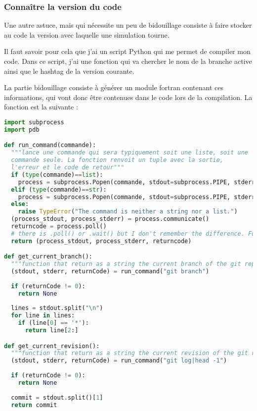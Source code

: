 \subsubsection{Connaître la version du code} 
Une autre astuce, mais qui nécessite un peu de bidouillage consiste à faire stocker au code la version avec laquelle une simulation tourne. 

Il faut savoir pour cela que j'ai un script Python qui me permet de compiler mon code. Dans ce script, j'ai une fonction qui va chercher le nom de la branche active ainsi que le hashtag de la version courante. 

La partie bidouillage consiste à générer un module fortran contenant ces informations, qui vont donc être contenues dans le code lors de la compilation. La fonction est la suivante :
\begin{lstlisting}[language=python]
import subprocess
import pdb

def run_command(commande):
  """lance une commande qui sera typiquement soit une liste, soit une 
  commande seule. La fonction renvoit un tuple avec la sortie, 
  l'erreur et le code de retour"""
  if (type(commande)==list):
    process = subprocess.Popen(commande, stdout=subprocess.PIPE, stderr=subprocess.PIPE)
  elif (type(commande)==str):
    process = subprocess.Popen(commande, stdout=subprocess.PIPE, stderr=subprocess.PIPE, shell=True)
  else:
    raise TypeError("The command is neither a string nor a list.")
  (process_stdout, process_stderr) = process.communicate()
  returncode = process.poll()
  # there is .poll() or .wait() but I don't remember the difference. For some kind of things, one of the two was not working
  return (process_stdout, process_stderr, returncode)

def get_current_branch():
  """function that return as a string the current branch of the git repository"""
  (stdout, stderr, returnCode) = run_command("git branch")
  
  if (returnCode != 0):
    return None
  
  lines = stdout.split("\n")
  for line in lines:
    if (line[0] == '*'):
      return line[2:]

def get_current_revision():
  """function that return as a string the current revision of the git repository"""
  (stdout, stderr, returnCode) = run_command("git log|head -1")
  
  if (returnCode != 0):
    return None
  
  commit = stdout.split()[1]
  return commit


\end{lstlisting}
